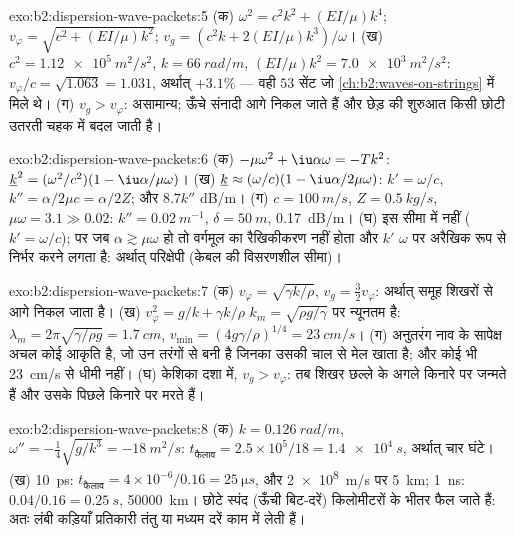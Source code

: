 \begin{solution}{exo:b2:dispersion-wave-packets:5}
(क) $\omega^2 = c^2k^2 + (EI/\mu)k^4$; $v_\varphi = \sqrt{c^2 + (EI/\mu)k^2}$; $v_g = (c^2k +
2(EI/\mu)k^3)/\omega$। (ख) $c^2 = \qty{1.12e5}{m^2/s^2}$, $k = \qty{66}{rad/m}$, $(EI/\mu)k^2
= \qty{7.0e3}{m^2/s^2}$: $v_\varphi/c = \sqrt{1.063} = 1.031$, अर्थात् $+3.1\%$ --- वही $53$ सेंट जो
\cref{ch:b2:waves-on-strings} में मिले थे। (ग) $v_g > v_\varphi$: असामान्य; ऊँचे
संनादी आगे निकल जाते हैं और छेड़ की शुरुआत किसी छोटी उतरती
चहक में बदल जाती है।
\end{solution}

\begin{solution}{exo:b2:dispersion-wave-packets:6}
(क) $-\mu\omega^2 + \iu\alpha\omega = -Tk^2$: $\underline k^2 = (\omega^2/c^2)(1 - \iu\alpha/\mu\omega)$।
(ख) $\underline k \approx (\omega/c)(1 - \iu\alpha/2\mu\omega)$: $k' = \omega/c$, $k'' = \alpha/2\mu c =
\alpha/2Z$; और $8.7k''$ dB/m। (ग) $c = \qty{100}{m/s}$, $Z = \qty{0.5}{kg/s}$, $\mu\omega = 3.1 \gg
0.02$: $k'' = \qty{0.02}{m^{-1}}$, $\delta = \qty{50}{m}$, \qty{0.17}{dB/m}। (घ) इस सीमा में
नहीं ($k' = \omega/c$); पर जब $\alpha \gtrsim \mu\omega$ हो तो वर्गमूल का
रैखिकीकरण नहीं होता और $k'$ $\omega$ पर अरैखिक रूप से निर्भर करने लगता है: अर्थात् परिक्षेपी (केबल की
विसरणशील सीमा)।
\end{solution}

\begin{solution}{exo:b2:dispersion-wave-packets:7}
(क) $v_\varphi = \sqrt{\gamma k/\rho}$, $v_g = \tfrac32v_\varphi$: अर्थात् समूह शिखरों से आगे
निकल जाता है। (ख) $v_\varphi^2 = g/k + \gamma k/\rho$ $k_m = \sqrt{\rho g/\gamma}$ पर न्यूनतम है:
$\lambda_m = 2\pi\sqrt{\gamma/\rho g} = \qty{1.7}{cm}$, $v_{\min} = (4g\gamma/\rho)^{1/4} =
\qty{23}{cm/s}$। (ग) अनुतरंग नाव के सापेक्ष अचल कोई आकृति है,
जो उन तरंगों से बनी है जिनका  उसकी चाल से मेल खाता है; और कोई भी
\qty{23}{cm/s} से धीमी नहीं। (घ) केशिका दशा में, $v_g > v_\varphi$: तब शिखर
छल्ले के अगले किनारे पर जन्मते हैं और उसके पिछले किनारे पर मरते हैं।
\end{solution}

\begin{solution}{exo:b2:dispersion-wave-packets:8}
(क) $k = \qty{0.126}{rad/m}$, $\omega'' = -\tfrac14\sqrt{g/k^3} = \qty{-18}{m^2/s}$: $t_{\text{फैलाव}}
= 2.5 \times 10^5/18 = \qty{1.4e4}{s}$, अर्थात् चार घंटे। (ख) \qty{10}{ps}: $t_{\text{फैलाव}} =
4 \times 10^{-6}/0.16 = \qty{25}{\micro s}$, और \qty{2e8}{m/s} पर \qty{5}{km}; \qty{1}{ns}: $0.04/0.16 =
\qty{0.25}{s}$, \qty{50000}{km}। छोटे स्पंद (ऊँची बिट-दरें) किलोमीटरों के भीतर
फैल जाते हैं: अतः लंबी कड़ियाँ प्रतिकारी तंतु या मध्यम दरें काम में लेती हैं।
\end{solution}

